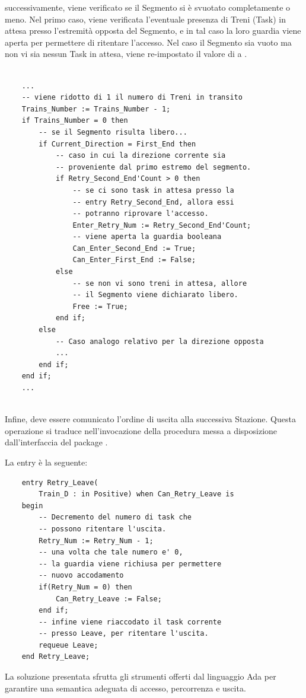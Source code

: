 	successivamente, viene verificato se il Segmento si è svuotato completamente o meno. Nel primo caso, viene verificata l'eventuale presenza di Treni (Task) in attesa presso l'estremità opposta del Segmento, e in tal caso la loro guardia viene aperta per permettere
di ritentare l'accesso. Nel caso il Segmento sia vuoto ma non vi sia nessun Task in attesa, viene re-impostato il valore di  a .

\begin{lstlisting}
	
	...
	-- viene ridotto di 1 il numero di Treni in transito
	Trains_Number := Trains_Number - 1;
	if Trains_Number = 0 then
		-- se il Segmento risulta libero...
		if Current_Direction = First_End then
			-- caso in cui la direzione corrente sia 
			-- proveniente dal primo estremo del segmento.
			if Retry_Second_End'Count > 0 then
				-- se ci sono task in attesa presso la
				-- entry Retry_Second_End, allora essi 
				-- potranno riprovare l'accesso.
				Enter_Retry_Num := Retry_Second_End'Count;
				-- viene aperta la guardia booleana
				Can_Enter_Second_End := True;
				Can_Enter_First_End := False;
			else
				-- se non vi sono treni in attesa, allore
				-- il Segmento viene dichiarato libero.
				Free := True;
			end if;
		else
			-- Caso analogo relativo per la direzione opposta
			...
		end if;
	end if;
	...
	
\end{lstlisting}
	
	Infine, deve essere comunicato l'ordine di uscita alla successiva Stazione. Questa operazione si traduce nell'invocazione della procedura  messa a disposizione dall'interfaccia  del package . 
	
	La entry  è la seguente:
	
\begin{lstlisting}
	entry Retry_Leave(
		Train_D : in Positive) when Can_Retry_Leave is
	begin
		-- Decremento del numero di task che
		-- possono ritentare l'uscita.
		Retry_Num := Retry_Num - 1;
		-- una volta che tale numero e' 0, 
		-- la guardia viene richiusa per permettere
		-- nuovo accodamento
		if(Retry_Num = 0) then
			Can_Retry_Leave := False;
		end if;
		-- infine viene riaccodato il task corrente
		-- presso Leave, per ritentare l'uscita.
		requeue Leave;
	end Retry_Leave;

\end{lstlisting}

La soluzione presentata sfrutta gli strumenti offerti dal linguaggio Ada per garantire una semantica adeguata di accesso, percorrenza e uscita.

